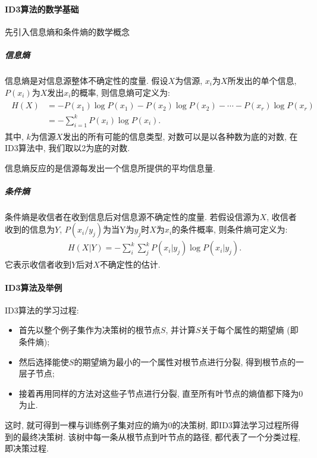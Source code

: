 \paragraph{ID3算法的数学基础}
先引入信息熵和条件熵的数学概念
\subparagraph{信息熵}
信息熵是对信息源整体不确定性的度量. 假设$X$为信源, $x_i$为$X$所发出的单个信息, $P (x_i)$为$X$发出$x_i$的概率, 则信息熵可定义为:
\begin{align}
  \begin{aligned}
    H (X) &=-P\left (x_{1}\right) \log P\left (x_{1}\right)-P\left (x_{2}\right) \log P\left (x_{2}\right)-\cdots-P\left (x_{r}\right) \log P\left (x_{r}\right) \\
                       &=-\sum_{i=1}^{k} P\left (x_{i}\right) \log P\left (x_{i}\right).
  \end{aligned}
\end{align}
其中, $k$为信源$X$发出的所有可能的信息类型, 对数可以是以各种数为底的对数, 在ID3算法中, 我们取以2为底的对数.
\begin{remark}
 信息熵反应的是信源每发出一个信息所提供的平均信息量.
\end{remark}
\subparagraph{条件熵}
条件熵是收信者在收到信息后对信息源不确定性的度量. 若假设信源为$X$, 收信者收到的信息为$Y$,  $P (x_i/y_j)$为当Y为$y_j$时$X$为$x_i$的条件概率, 则条件熵可定义为:
\begin{align}
    H (X | Y)=-\sum_{i}^{k} \sum_{j}^{k} P\left (x_{i} | y_{j}\right) \log P\left (x_{i} | y_{j}\right).
\end{align}
它表示收信者收到$Y$后对$X$不确定性的估计.

\paragraph{ID3算法及举例} 
ID3算法的学习过程:
\begin{itemize}
\item 首先以整个例子集作为决策树的根节点$S$, 并计算$S$关于每个属性的期望熵 (即条件熵);
\item 然后选择能使$S$的期望熵为最小的一个属性对根节点进行分裂, 得到根节点的一层子节点;
\item 接着再用同样的方法对这些子节点进行分裂, 直至所有叶节点的熵值都下降为0为止.
\end{itemize}
这时, 就可得到一棵与训练例子集对应的熵为0的决策树, 即ID3算法学习过程所得到的最终决策树. 该树中每一条从根节点到叶节点的路径, 都代表了一个分类过程, 即决策过程.

